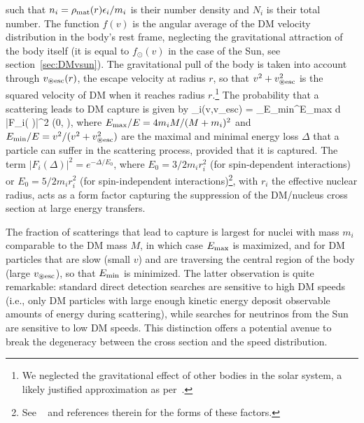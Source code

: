such that  $n_i = \rho_{\rm mat}(r) \epsilon_i/m_i$ is their number density and $N_i$ is their total number.
The function $f(v)$ is the angular average of the DM velocity distribution 
in the body's rest frame, 
neglecting the gravitational attraction of the body itself (it is equal to $f_\odot(v)$ in the case of the Sun, see section~\ref{sec:DMvsun}).
The gravitational pull of the body is taken into account through
$v_{\circledast\rm esc}(r)$, the escape velocity at radius $r$, so that $v^2 + v_{\circledast\rm esc}^2$ is the squared velocity of DM when it reaches 
radius $r$.\footnote{We neglected the gravitational effect of other bodies in the solar system, a likely justified approximation as per~\cite{DMnuplanets}.}
The probability that a scattering leads to DM capture is given by
\beq 
\wp_i(v,v_{\circledast\rm esc}) =   \int_{E_{\rm min}}^{E_{\rm max}} {\rm d}\Delta\, |F_i( \Delta )|^2 \approx\max\bigg(0, \bigg),
\eeq
where $E_{\rm max}/E=4 m_i M /(M +m_i)^2$ and  
$E_{\rm min}/E=v^2/(v^2+v_{\circledast\rm esc}^2)$ are the maximal and minimal energy loss $\Delta$ that a particle can suffer in the scattering process, provided that it is captured.
The term $|F_i(\Delta)|^2=e^{-\Delta/E_0}$, where 
$E_0 = 3/2m_i r_i^2$ (for spin-dependent interactions) or $E_0=5/2m_i r_i^2$ (for spin-independent interactions)\footnote{See ~\cite{DMnu} and references therein for the forms of these factors.}, with $r_i$ the effective nuclear radius, acts as a form factor capturing the suppression of the DM/nucleus cross section at large energy transfers.


The fraction of scatterings that lead to capture is largest for nuclei with mass $m_i$ comparable to the DM mass $M$, in which case $E_{\rm max}$ is maximized, and for DM particles that are slow (small $v$) and are traversing  the central region of the body (large $v_{\circledast \rm esc}$), so that $E_{\rm min}$ is minimized. The latter observation is quite remarkable: standard direct detection searches are sensitive to high DM speeds (i.e., only DM particles with large enough kinetic energy deposit observable amounts of energy during scattering),
while searches for neutrinos from the Sun are sensitive to low DM speeds.
This distinction offers a potential avenue to break the degeneracy between the cross section and the speed distribution.


\medskip

